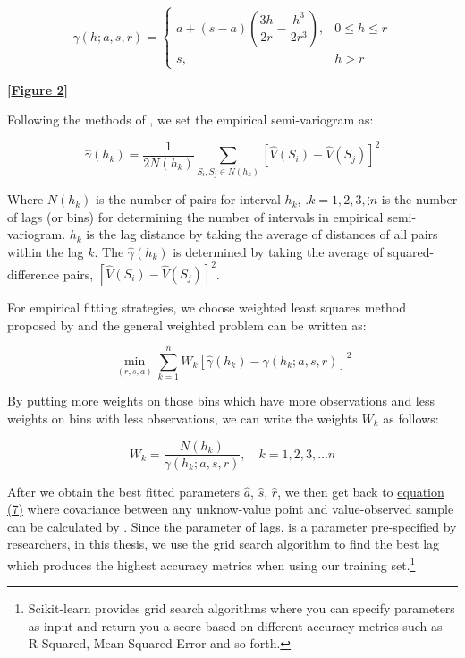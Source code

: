 \documentclass[a4paper, 12pt]{article} %
\begin{document}
\begin{equation}
\gamma(h; a, s, r) = \begin{cases}
a + (s - a)(\dfrac{3h}{2r} - \dfrac{h^3}{2r^3}), & 0 \leq h \leq r \\
s, & h>r
\end{cases}
\end{equation}

\bigskip
 \centerline{\bf [\hyperref[fig2]{Figure 2}]}
\bigskip

Following the methods of \citet{schabenberger2004statistical, kuntz2014geostatistical}, we set the empirical semi-variogram as:

\begin{equation}
\widehat{\gamma}(h_k) = \dfrac{1}{2N(h_k)} \sum_{S_i, S_j \in N(h_k)}[\widehat{V}(S_i) - \widehat{V}(S_j)]^2
\end{equation}

Where $N(h_k)$ is the number of pairs for interval $h_k$, .$k=1,2,3, \vdots n$ is the number of lags (or bins) for determining the number of intervals in empirical semi-variogram. $h_k$ is the lag distance by taking the average of distances of all pairs within the lag $k$. The $\widehat{\gamma}(h_k)$ is determined by taking the average of squared-difference pairs, $[\widehat{V}(S_i) - \widehat{V}(S_j)]^2$.

For empirical fitting strategies, we choose weighted least squares method proposed by \citet{cressie1992statistics, kuntz2014geostatistical} and the general weighted problem can be written as:

\begin{equation}
\label{eq15}
\min_{(r,s,a)}\sum_{k=1}^n W_k[\widehat{\gamma}(h_k) - \gamma(h_k;a,s,r)]^2
\end{equation}

By putting more weights on those bins which have more observations and less weights on bins with less observations, we can write the weights $W_k$ as follows:

\begin{equation}
\label{eq16}
W_k = \dfrac{N(h_k)}{\gamma(h_k;a,s,r)}, \quad k=1,2,3,\hdots n
\end{equation}

After we obtain the best fitted parameters $\widehat{a}$, $\widehat{s}$, $\widehat{r}$, we then get back to \hyperref[eq7]{equation (7)} where covariance between any unknow-value point and value-observed sample can be calculated by . Since the parameter of lags,  is a parameter pre-specified by researchers, in this thesis, we use the grid search algorithm to find the best lag  which produces the highest accuracy metrics when using our training set.\footnote{Scikit-learn provides grid search algorithms where you can specify parameters as input and return you a score based on different accuracy metrics such as R-Squared, Mean Squared Error and so forth.}
\end{document}
